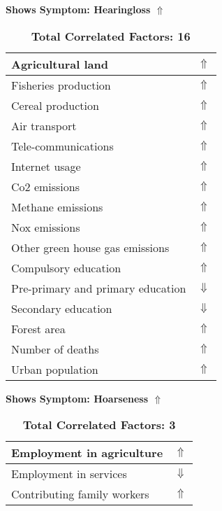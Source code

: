 \documentclass[12pt,notitlepage,oneside]{report}
\begin{document}
\clearpage
\begin{table}[!htb]
\caption{\textbf{Shows Symptom: Hearingloss $\Uparrow$}}
\centering
\label{Correlated Socio-economic Factors0}
\begin{tabular}{|l|l|}
\hline
Agricultural land & $\Uparrow$\\ \hline
Fisheries production & $\Uparrow$\\ \hline
Cereal production & $\Uparrow$\\ \hline
Air transport  & $\Uparrow$\\ \hline
Tele-communications & $\Uparrow$\\ \hline
Internet usage & $\Uparrow$\\ \hline
Co2 emissions & $\Uparrow$\\ \hline
Methane emissions & $\Uparrow$\\ \hline
Nox emissions & $\Uparrow$\\ \hline
Other green house gas emissions & $\Uparrow$\\ \hline
Compulsory education & $\Uparrow$\\ \hline
Pre-primary and primary education & $\Downarrow$\\ \hline
Secondary education & $\Downarrow$\\ \hline
Forest area & $\Uparrow$\\ \hline
Number of deaths & $\Uparrow$\\ \hline
Urban population & $\Uparrow$\\ \hline
\end{tabular}
\caption*{\textbf{Total Correlated Factors: 16}}
\end{table}
\begin{table}[!htb]
\caption{\textbf{Shows Symptom: Hoarseness $\Uparrow$}}
\centering
\label{Correlated Socio-economic Factors0}
\begin{tabular}{|l|l|}
\hline
Employment in agriculture & $\Uparrow$\\ \hline
Employment in services & $\Downarrow$\\ \hline
Contributing family workers & $\Uparrow$\\ \hline
\end{tabular}
\caption*{\textbf{Total Correlated Factors: 3}}
\end{table}
\end{document}
